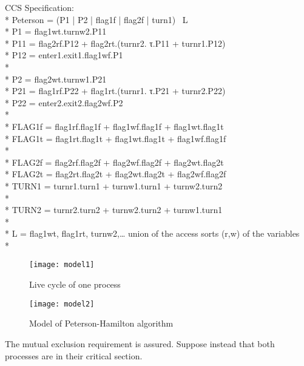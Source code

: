 CCS Specification:\\*
Peterson = (P1 | P2 | flag1f | flag2f | turn1) \ L\\*
P1 = flag1wt.turnw2.P11\\*
P11 = flag2rf.P12 + flag2rt.(turnr2. τ.P11 + turnr1.P12)\\*
P12 = enter1.exit1.flag1wf.P1\\*\\*
P2 = flag2wt.turnw1.P21\\*
P21 = flag1rf.P22 + flag1rt.(turnr1. τ.P21 + turnr2.P22)\\*
P22 = enter2.exit2.flag2wf.P2\\*\\*
FLAG1f = flag1rf.flag1f + flag1wf.flag1f + flag1wt.flag1t\\*
FLAG1t = flag1rt.flag1t + flag1wt.flag1t + flag1wf.flag1f\\*\\*
FLAG2f = flag2rf.flag2f + flag2wf.flag2f + flag2wt.flag2t\\*
FLAG2t = flag2rt.flag2t + flag2wt.flag2t + flag2wf.flag2f\\*
TURN1 = turnr1.turn1 + turnw1.turn1 + turnw2.turn2\\*\\*
TURN2 = turnr2.turn2 + turnw2.turn2 + turnw1.turn1\\*\\*
L = { flag1wt, flag1rt, turnw2,… union of the access sorts (r,w) of the
variables }\\*

\begin{figure}[h!]
\centering
\texttt{[image: model1]}
\caption{Live cycle of one process}
\label{fig:model1}
\end{figure}

\begin{figure}[h!]
\centering
\texttt{[image: model2]}
\caption{Model of Peterson-Hamilton algorithm}
\label{fig:model2}
\end{figure}

The mutual exclusion requirement is assured. Suppose instead that both processes are in their critical section. 

